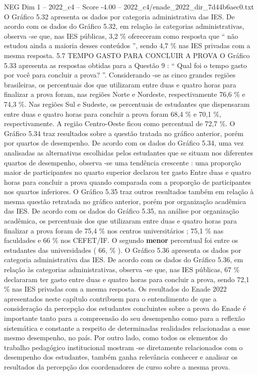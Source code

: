 \begin{textsample}{NEG Dim 1 – 2022\_c4 – Score -4.00 – 2022\_c4/enade\_2022\_dir\_7d44b6aec0.txt}
O Gráfico 5.32 apresenta os dados por categoria administrativa das IES.
De acordo com os dados do Gráfico 5.32, em relação às categorias administrativas, observa -se que, nas IES públicas, 3,2 \% ofereceram como resposta que “ não estudou ainda a maioria desses conteúdos ”, sendo 4,7 \% nas IES privadas com a mesma resposta. 5.7 TEMPO GASTO PARA CONCLUIR A PROVA O Gráfico 5.33 apresenta as respostas obtidas para a Questão 9 : “ Qual foi o tempo gasto por você para concluir a prova? ”.
Considerando -se as cinco grandes regiões brasileiras, os percentuais dos que utilizaram entre duas e quatro horas para finalizar a prova foram, nas regiões Norte e Nordeste, respectivamente 76,6 \% e 74,3 \%.
Nas regiões Sul e Sudeste, os percentuais de estudantes que dispensaram entre duas e quatro horas para concluir a prova foram 68,4 \% e 70,1 \%, respectivamente.
A região Centro-Oeste ficou como percentual de 72,7 \%.
O Gráfico 5.34 traz resultados sobre a questão tratada no gráfico anterior, porém por quartos de desempenho.
De acordo com os dados do Gráfico 5.34, uma vez analisadas as alternativas escolhidas pelos estudantes que se situam nos diferentes quartos de desempenho, observa -se uma tendência crescente : uma proporção maior de participantes no quarto superior declarou ter gasto Entre duas e quatro horas para concluir a prova quando comparada com a proporção de participantes nos quartos inferiores.
O Gráfico 5.35 traz outros resultados também em relação à mesma questão retratada no gráfico anterior, porém por organização acadêmica das IES.
De acordo com os dados do Gráfico 5.35, na análise por organização acadêmica, os percentuais dos que utilizaram entre duas e quatro horas para finalizar a prova foram de 75,4 \% nos centros universitários ; 75,1 \% nas faculdades e 66 \% nos CEFET/IF.
O segundo \textbf{menor} percentual foi entre os estudantes das universidades ( 66, \% ).
O Gráfico 5.36 apresenta os dados por categoria administrativa das IES.
De acordo com os dados do Gráfico 5.36, em relação às categorias administrativas, observa -se que, nas IES públicas, 67 \% declararam ter gasto entre duas e quatro horas para concluir a prova, sendo 72,1 \% nas IES privadas com a mesma resposta.
Os resultados do Enade 2022 apresentados neste capítulo contribuem para o entendimento de que a consideração da percepção dos estudantes concluintes sobre a prova do Enade é importante tanto para a compreensão do seu desempenho como para a reflexão sistemática e constante a respeito de determinadas realidades relacionadas a esse mesmo desempenho, no país.
Por outro lado, como todos os elementos do trabalho pedagógico institucional mostram -se diretamente relacionados com o desempenho dos estudantes, também ganha relevância conhecer e analisar os resultados da percepção dos coordenadores de curso sobre a mesma prova.

\end{textsample}
